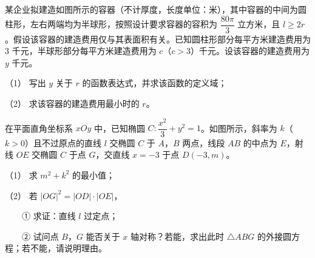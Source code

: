 \begin{question}
某企业拟建造如图所示的容器（不计厚度，长度单位：米），其中容器的中间为圆柱形，左右两端均为半球形，按照设计要求容器的容积为 $\dfrac{80\pi}{3}$ 立方米，且 $l\geqslant 2r$。假设该容器的建造费用仅与其表面积有关。已知圆柱形部分每平方米建造费用为 $3$ 千元，半球形部分每平方米建造费用为 $c$（$c>3$）千元。设该容器的建造费用为 $y$ 千元。

（1） 写出 $y$ 关于 $r$ 的函数表达式，并求该函数的定义域；

（2） 求该容器的建造费用最小时的 $r$。
\nopagebreak[4]
\begin{center}\end{center}
\nopagebreak[4]
\Needspace{0.4\textheight}
\end{question}
\begin{question}
在平面直角坐标系 $xOy$ 中，已知椭圆 $C:\dfrac{x^2}{3}+y^2=1$。如图所示，斜率为 $k$（$k>0$）且不过原点的直线 $l$ 交椭圆 $C$ 于 $A$，$B$ 两点，线段 $AB$ 的中点为 $E$，射线 $OE$ 交椭圆 $C$ 于点 $G$，交直线 $x=-3$ 于点 $D(-3,m)$。

（1） 求 $m^2+k^2$ 的最小值；

（2） 若 $|OG|^2=|OD|\cdot|OE|$，

　　① 求证：直线 $l$ 过定点；

　　② 试问点 $B$，$G$ 能否关于 $x$ 轴对称？若能，求出此时 $\triangle ABG$ 的外接圆方程；若不能，请说明理由。
\nopagebreak[4]
\begin{center}\end{center}
\nopagebreak[4]

\end{question}